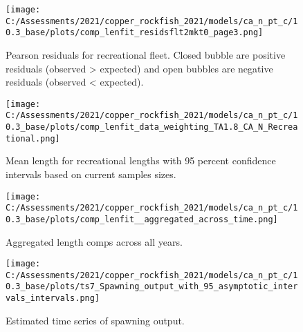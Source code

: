 \documentclass[11pt,
  english,
  a4paper,
]{article}
\begin{document}
\begin{figure}
\centering
\texttt{[image: C:/Assessments/2021/copper\_rockfish\_2021/models/ca\_n\_pt\_c/10.3\_base/plots/comp\_lenfit\_residsflt2mkt0\_page3.png]}
\caption{Pearson residuals for recreational fleet. Closed bubble are positive residuals (observed \textgreater{} expected) and open bubbles are negative residuals (observed \textless{} expected).\label{fig:rec-pearson}}
\end{figure}

\tagmcend\tagstructend


\begin{figure}
\centering
\texttt{[image: C:/Assessments/2021/copper\_rockfish\_2021/models/ca\_n\_pt\_c/10.3\_base/plots/comp\_lenfit\_data\_weighting\_TA1.8\_CA\_N\_Recreational.png]}
\caption{Mean length for recreational lengths with 95 percent confidence intervals based on current samples sizes.\label{fig:rec-mean-len-fit}}
\end{figure}

\tagmcend\tagstructend


\begin{figure}
\centering
\texttt{[image: C:/Assessments/2021/copper\_rockfish\_2021/models/ca\_n\_pt\_c/10.3\_base/plots/comp\_lenfit\_\_aggregated\_across\_time.png]}
\caption{Aggregated length comps across all years.\label{fig:agg-len-fit}}
\end{figure}

\tagmcend\tagstructend


\begin{figure}
\centering
\texttt{[image: C:/Assessments/2021/copper\_rockfish\_2021/models/ca\_n\_pt\_c/10.3\_base/plots/ts7\_Spawning\_output\_with\_95\_asymptotic\_intervals\_intervals.png]}
\caption{Estimated time series of spawning output.\label{fig:ssb}}
\end{figure}

\tagmcend\tagstructend
\end{document}
